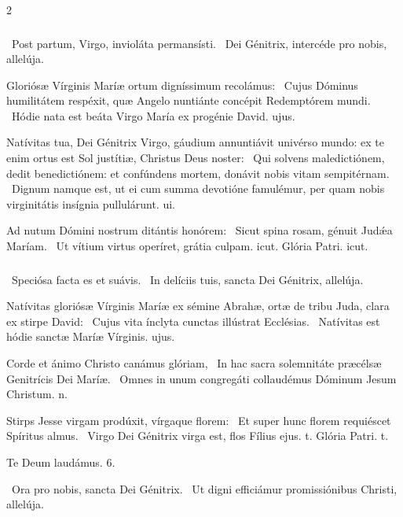 \documentclass[9pt,twoside]{extarticle}
\begin{document}
\begin{multicols}{2}
\subsubsection*{}
\begin{tightlist}{}
\item {}~Post partum, Virgo, invioláta permansísti. ~Dei Génitrix, intercéde pro nobis, allelúja.
\item {}  Gloriósæ Vírginis Maríæ ortum digníssimum recolámus: \textred{*}~Cujus Dóminus humilitátem respéxit, quæ Angelo nuntiánte concépit Redemptórem mundi. ~Hódie nata est beáta Virgo María ex progénie David. ujus.
\item {} Natívitas tua, Dei Génitrix Virgo, gáudium annuntiávit univérso mundo: ex te enim ortus est Sol justítiæ, Christus Deus noster: \textred{*}~Qui solvens maledictiónem, dedit benedictiónem: et confúndens mortem, donávit nobis vitam sempitérnam. ~Dignum namque est, ut ei cum summa devotióne famulémur, per quam nobis virginitátis insígnia pullulárunt. ui.
\item {} Ad nutum Dómini nostrum ditántis honórem: \textred{*}~Sicut spina rosam, génuit Judǽa Maríam. ~Ut vítium virtus operíret, grátia culpam. icut. Glória Patri. icut.
\end{tightlist}
\subsubsection*{}
\begin{tightlist}{}
\item {}~Speciósa facta es et suávis. ~In delíciis tuis, sancta Dei Génitrix, allelúja. 
\item {} Natívitas gloriósæ Vírginis Maríæ ex sémine Abrahæ, ortæ de tribu Juda, clara ex stirpe David: \textred{*}~Cujus vita ínclyta cunctas illústrat Ecclésias. ~Natívitas est hódie sanctæ Maríæ Vírginis. ujus.
\item {} Corde et ánimo Christo canámus glóriam, \textred{*}~In hac sacra solemnitáte præcélsæ Genitrícis Dei Maríæ. ~Omnes in unum congregáti collaudémus Dóminum Jesum Christum. n.
\item {} Stirps Jesse virgam prodúxit, vírgaque florem: \textred{*}~Et super hunc florem requiéscet Spíritus almus. ~Virgo Dei Génitrix virga est, flos Fílius ejus. t. Glória Patri. t.
\item Te Deum laudámus. 6.
\item {}~Ora pro nobis, sancta Dei Génitrix. ~Ut digni efficiámur promissiónibus Christi, allelúja.
\end{tightlist}


\end{multicols}
\end{document}
